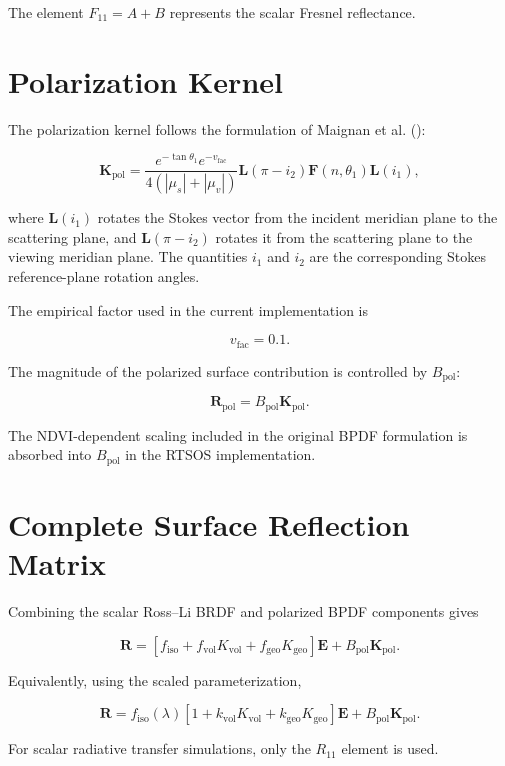 \documentclass[
  11pt,
  letterpaper,
]{scrreprt}
\begin{document}
The element \(F_{11}=A+B\) represents the scalar Fresnel reflectance.

\section{Polarization Kernel}\label{polarization-kernel}

The polarization kernel follows the formulation of Maignan et al.
():

\[
\mathbf{K}_{\mathrm{pol}}
=
\frac{
e^{-\tan\theta_1}
e^{-v_{\mathrm{fac}}}
}{
4(|\mu_s|+|\mu_v|)
}
\mathbf{L}(\pi-i_2)
\mathbf{F}(n,\theta_1)
\mathbf{L}(i_1),
\]

where \(\mathbf{L}(i_1)\) rotates the Stokes vector from the incident
meridian plane to the scattering plane, and \(\mathbf{L}(\pi-i_2)\)
rotates it from the scattering plane to the viewing meridian plane. The
quantities \(i_1\) and \(i_2\) are the corresponding Stokes
reference-plane rotation angles.

The empirical factor used in the current implementation is

\[
v_{\mathrm{fac}}=0.1.
\]

The magnitude of the polarized surface contribution is controlled by
\(B_{\mathrm{pol}}\):

\[
\mathbf{R}_{\mathrm{pol}}
=
B_{\mathrm{pol}}\mathbf{K}_{\mathrm{pol}}.
\]

The NDVI-dependent scaling included in the original BPDF formulation is
absorbed into \(B_{\mathrm{pol}}\) in the RTSOS implementation.

\section{Complete Surface Reflection
Matrix}\label{complete-surface-reflection-matrix}

Combining the scalar Ross--Li BRDF and polarized BPDF components gives

\[
\mathbf{R}
=
\left[
f_{\mathrm{iso}}
+
f_{\mathrm{vol}}K_{\mathrm{vol}}
+
f_{\mathrm{geo}}K_{\mathrm{geo}}
\right]\mathbf{E}
+
B_{\mathrm{pol}}\mathbf{K}_{\mathrm{pol}}.
\]

Equivalently, using the scaled parameterization,

\[
\mathbf{R}
=
f_{\mathrm{iso}}(\lambda)
\left[
1
+
k_{\mathrm{vol}}K_{\mathrm{vol}}
+
k_{\mathrm{geo}}K_{\mathrm{geo}}
\right]\mathbf{E}
+
B_{\mathrm{pol}}\mathbf{K}_{\mathrm{pol}}.
\]

For scalar radiative transfer simulations, only the \(R_{11}\) element
is used.
\end{document}
